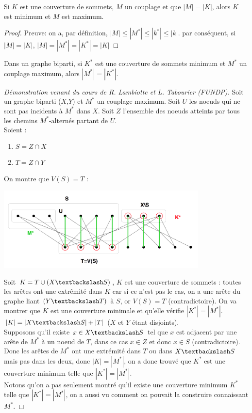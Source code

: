 \begin{mylem}
  Si $K$ est une couverture de sommets, $M$ un couplage et que $|M| = |K|$, alors $K$ est minimum et $M$ est maximum.
  \begin{proof}
     Preuve: on a, par définition, $|M| \leq |M^*| \leq |k^*| \leq |k|$. par conséquent, si $|M| = |K|$, $|M| = |M^*| = |K^*| = |K|$
  \end{proof}
\end{mylem}

\begin{mytheo} [König]
  Dans un graphe biparti, si $K^*$ est une couverture de sommets minimum et $M^*$ un couplage maximum, alors $|M^*| = |K^*|$.
  \begin{proof} [Démonstration venant du cours de R. Lambiotte et L. Tabourier  (FUNDP)]
    Soit un graphe biparti ($X$,$Y$) et $M^*$ un couplage maximum.
    Soit $U$ les noeuds qui ne sont pas incidents à $M^*$ dans $X$.
    Soit $Z$ l'ensemble des noeuds atteints par tous les chemins $M^*$-alternés partant de $U$.\\
    Soient :
    \begin{enumerate}
      \item $S = Z \cap X$
      \item $T = Z \cap Y$
    \end{enumerate}
    On montre que $V(S) = T$ :
    \begin{center}
      \includegraphics[width=300pt]{../img/konig}
    \end{center}
    Soit $K = T \cup (X \textbackslash S)$, $K$ est une couverture de sommets : toutes les arêtes ont une extrêmité dans $K$ car si ce n'est pas le cas, on a une arête du graphe liant $(Y \textbackslash T)$ à $S$, or $V(S) = T$ (contradictoire). On va montrer que $K$ est une couverture minimale et qu'elle vérifie $|K^*| = |M^*|$.\\
    $|K| = |X \textbackslash S| + |T|$ ($X$ et $Y$ étant disjoints).\\
    Supposons qu'il existe $x \in X \textbackslash S$ tel que $x$ est adjacent par une arête de $M^*$ à un noeud de $T$, dans ce cas $x \in Z$ et donc $x \in S$ (contradictoire). Donc les arêtes de $M^*$ ont une extrémité dans $T$ ou dans $X \textbackslash S$ mais pas dans les deux, donc $|K| = |M^*|$, on a donc trouvé que $K^*$ est une couverture minimum telle que $|K^*| = |M^*|$.\\
    Notons qu'on a pas seulement montré qu'il existe une couverture minimum $K^*$ telle que $|K^*| = |M^*|$, on a aussi vu comment on pouvait la construire connaissant $M^*$.
  \end{proof}
\end{mytheo}

